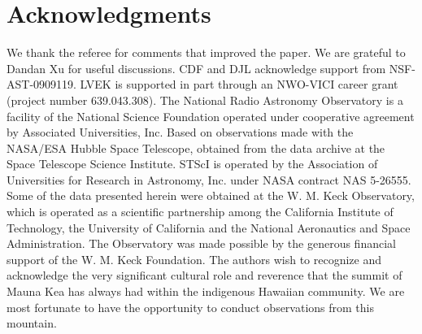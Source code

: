 \documentclass[a4paper,fleqn,usenatbib,useAMS]{mnras}
\begin{document}

\section*{Acknowledgments}
We thank the referee for comments that improved the paper.  We are grateful to Dandan Xu for useful discussions. CDF and DJL acknowledge support from NSF-AST-0909119.  LVEK is supported in part through an NWO-VICI career grant (project number 639.043.308). The National Radio Astronomy Observatory is a facility of the National Science Foundation operated under cooperative agreement by Associated Universities, Inc. Based on observations made with the NASA/ESA Hubble Space Telescope, obtained from the data archive at the Space Telescope Science Institute. STScI is operated by the Association of Universities for Research in Astronomy, Inc. under NASA contract NAS 5-26555. Some of the data presented herein were obtained at the W. M. Keck Observatory, which is operated as a scientific partnership among the California Institute of Technology, the University of California and the National Aeronautics and Space Administration. The Observatory was made possible by the generous financial support of the W. M. Keck Foundation. The authors wish to recognize and acknowledge the very significant cultural role and reverence that the summit of Mauna Kea has always had within the indigenous Hawaiian community.  We are most fortunate to have the opportunity to conduct observations from this mountain.






\bsp
\label{lastpage}
\end{document}
